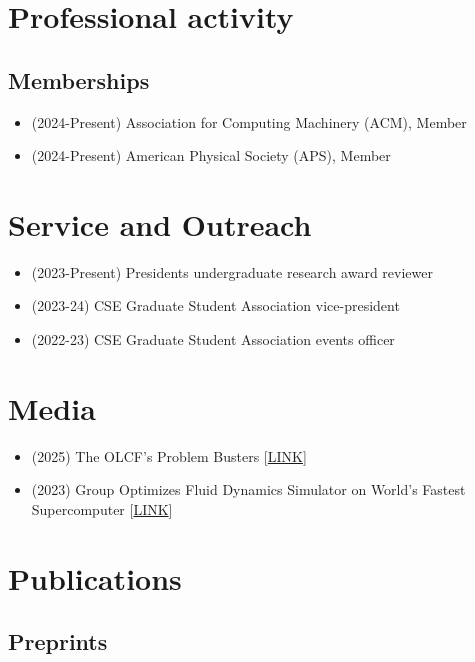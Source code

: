 \documentclass{article}
\begin{document}
\section{Professional activity}

\subsection{Memberships}
\begin{itemize}
    \item[\faChevronRight] (2024-Present) Association for Computing Machinery (ACM), Member
    \item[\faChevronRight] (2024-Present) American Physical Society (APS), Member
\end{itemize}

\section{Service and Outreach}
\begin{itemize}
    \item[\faChevronRight] (2023-Present) Presidents undergraduate research award reviewer
    \item[\faChevronRight] (2023-24) CSE Graduate Student Association vice-president
    \item[\faChevronRight] (2022-23) CSE Graduate Student Association events officer
    \end{itemize}

\section{Media}
\begin{itemize}
    \item[\faNewspaper] (2025) The OLCF's Problem Busters [\href{https://www.olcf.ornl.gov/2025/02/11/the-olcfs-problem-busters/}{LINK}]
    \item[\faNewspaper] (2023) Group Optimizes Fluid Dynamics Simulator on World’s Fastest Supercomputer [\href{https://www.cc.gatech.edu/news/group-optimizes-fluid-dynamics-simulator-worlds-fastest-supercomputer}{LINK}]
\end{itemize}

\section{Publications}

\subsection{Preprints}
\end{document}
